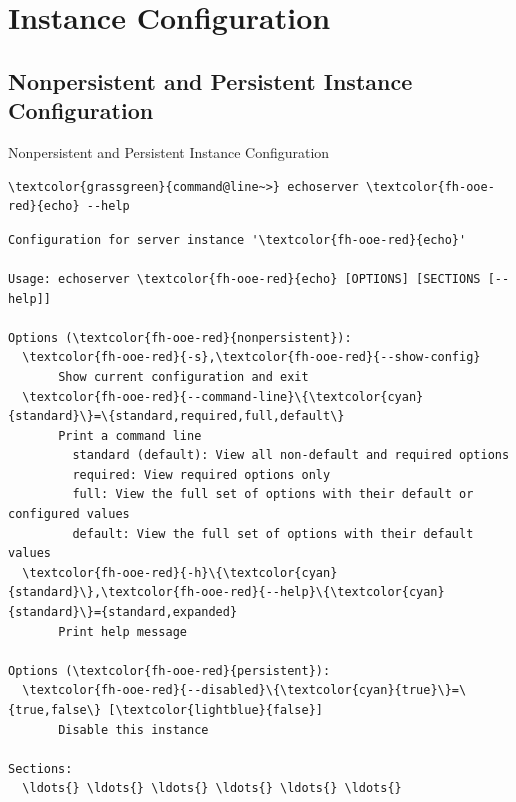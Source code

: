 \withsectionpage
\section{Instance Configuration}
\nosectionpage
\subsection{Nonpersistent and Persistent Instance Configuration}

\begin{frame}[fragile]{Nonpersistent and Persistent Instance Configuration}
\begin{scriptsize}
\begin{Verbatim}[commandchars=\\\{\}]
\textcolor{grassgreen}{command@line~>} echoserver \textcolor{fh-ooe-red}{echo} --help
\end{Verbatim}
\begin{Verbatim}[commandchars=\\\{\},frame=leftline,rulecolor=\color{fh-ooe-red}]
Configuration for server instance '\textcolor{fh-ooe-red}{echo}'

Usage: echoserver \textcolor{fh-ooe-red}{echo} [OPTIONS] [SECTIONS [--help]]

Options (\textcolor{fh-ooe-red}{nonpersistent}):
  \textcolor{fh-ooe-red}{-s},\textcolor{fh-ooe-red}{--show-config}
       Show current configuration and exit
  \textcolor{fh-ooe-red}{--command-line}\{\textcolor{cyan}{standard}\}=\{standard,required,full,default\}
       Print a command line
         standard (default): View all non-default and required options
         required: View required options only
         full: View the full set of options with their default or configured values
         default: View the full set of options with their default values
  \textcolor{fh-ooe-red}{-h}\{\textcolor{cyan}{standard}\},\textcolor{fh-ooe-red}{--help}\{\textcolor{cyan}{standard}\}={standard,expanded}
       Print help message

Options (\textcolor{fh-ooe-red}{persistent}):
  \textcolor{fh-ooe-red}{--disabled}\{\textcolor{cyan}{true}\}=\{true,false\} [\textcolor{lightblue}{false}]
       Disable this instance

Sections:
  \ldots{} \ldots{} \ldots{} \ldots{} \ldots{} \ldots{}
\end{Verbatim}
\end{scriptsize}
\end{frame}
